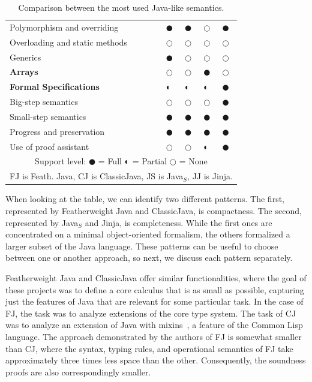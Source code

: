 \documentclass[tese,capa,english]{texufpel}
\begin{document}
\begin{table}[!htb]
\begin{tabular}{lllll}
		Polymorphism and overriding                       & $\CIRCLE$     & $\CIRCLE$     & $\Circle$     & $\CIRCLE$     \\
		Overloading and static methods                    & $\Circle$     & $\Circle$     & $\Circle$     & $\Circle$     \\
		Generics                                          & $\CIRCLE$     & $\Circle$     & $\Circle$     & $\Circle$     \\ \hline
		\textbf{Arrays}                                   & $\Circle$     & $\Circle$     & $\CIRCLE$     & $\Circle$     \\ \hline
		\textbf{Formal Specifications} & $\LEFTcircle$ & $\LEFTcircle$ & $\LEFTcircle$ & $\CIRCLE$     \\
		Big-step semantics                                & $\Circle$     & $\Circle$     & $\Circle$     & $\CIRCLE$     \\
		Small-step semantics                              & $\CIRCLE$     & $\CIRCLE$     & $\CIRCLE$     & $\CIRCLE$     \\
		Progress and preservation                         & $\CIRCLE$     & $\CIRCLE$     & $\CIRCLE$     & $\CIRCLE$     \\
		Use of proof assistant                            & $\Circle$     & $\Circle$     & $\LEFTcircle$ & $\CIRCLE$     \\ \hline
		\multicolumn{5}{c}{Support level: $\CIRCLE$ = Full $\LEFTcircle$ = Partial $\Circle$ = None}                      \\
		\multicolumn{5}{c}{FJ is Feath. Java, CJ is ClassicJava, JS is Java$_S$, JJ is Jinja.}                     \\ \hline
	\end{tabular}
	\vspace{1ex}
	\caption{Comparison between the most used Java-like semantics.}
	\label{tbl:comparison}
\end{table}

When looking at the table, we can identify two different patterns. The first, represented by Featherweight Java and ClassicJava, is compactness. The second, represented by Java$_S$ and Jinja, is completeness. While the first ones are concentrated on a minimal object-oriented formalism, the others formalized a larger subset of the Java language. These patterns can be useful to choose between one or another approach, so next, we discuss each pattern separately.

Featherweight Java and ClassicJava offer similar functionalities, where the goal of these projects was to define a core calculus that is as small as possible, capturing just the features of Java that are relevant for some particular task. In the case of FJ, the task was to analyze extensions of the core type system. The task of CJ was to analyze an extension of Java with mixins~\cite{Flatt:1998:CM:268946.268961}, a feature of the Common Lisp language. The approach demonstrated by the authors of FJ is somewhat smaller than CJ, where the syntax, typing rules, and operational semantics of FJ take approximately three times less space than the other. Consequently, the soundness proofs are also correspondingly smaller. 
\end{document}
